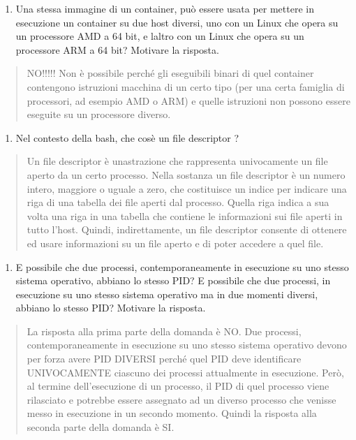 \begin{enumerate}
\def\labelenumi{\arabic{enumi}.}
\setcounter{enumi}{4}
\item
  Una stessa immagine di un container, può essere usata per mettere in
  esecuzione un container su due host diversi, uno con un Linux che
  opera su un processore AMD a 64 bit, e l\textquotesingle altro con un
  Linux che opera su un processore ARM a 64 bit? Motivare la risposta.
\end{enumerate}

\begin{quote}
NO!!!!! Non è possibile perché gli eseguibili binari di quel container
contengono istruzioni macchina di un certo tipo (per una certa famiglia
di processori, ad esempio AMD o ARM) e quelle istruzioni non possono
essere eseguite su un processore diverso.
\end{quote}

\begin{enumerate}
\def\labelenumi{\arabic{enumi}.}
\setcounter{enumi}{5}
\item
  Nel contesto della bash, che cos\textquotesingle è un file descriptor
  ?
\end{enumerate}

\begin{quote}
Un file descriptor è un\textquotesingle astrazione che rappresenta
univocamente un file aperto da un certo processo. Nella sostanza un file
descriptor è un numero intero, maggiore o uguale a zero, che costituisce
un indice per indicare una riga di una tabella dei file aperti dal
processo. Quella riga indica a sua volta una riga in una tabella che
contiene le informazioni sui file aperti in tutto l'host. Quindi,
indirettamente, un file descriptor consente di ottenere ed usare
informazioni su un file aperto e di poter accedere a quel file.
\end{quote}

\begin{enumerate}
\def\labelenumi{\arabic{enumi}.}
\setcounter{enumi}{6}
\item
  E\textquotesingle{} possibile che due processi, contemporaneamente in
  esecuzione su uno stesso sistema operativo, abbiano lo stesso PID?
  E\textquotesingle{} possibile che due processi, in esecuzione su uno
  stesso sistema operativo ma in due momenti diversi, abbiano lo stesso
  PID? Motivare la risposta.
\end{enumerate}

\begin{quote}
La risposta alla prima parte della domanda è NO. Due processi,
contemporaneamente in esecuzione su uno stesso sistema operativo devono
per forza avere PID DIVERSI perché quel PID deve identificare
UNIVOCAMENTE ciascuno dei processi attualmente in esecuzione. Però, al
termine dell'esecuzione di un processo, il PID di quel processo viene
rilasciato e potrebbe essere assegnato ad un diverso processo che
venisse messo in esecuzione in un secondo momento. Quindi la risposta
alla seconda parte della domanda è SI.
\end{quote}

